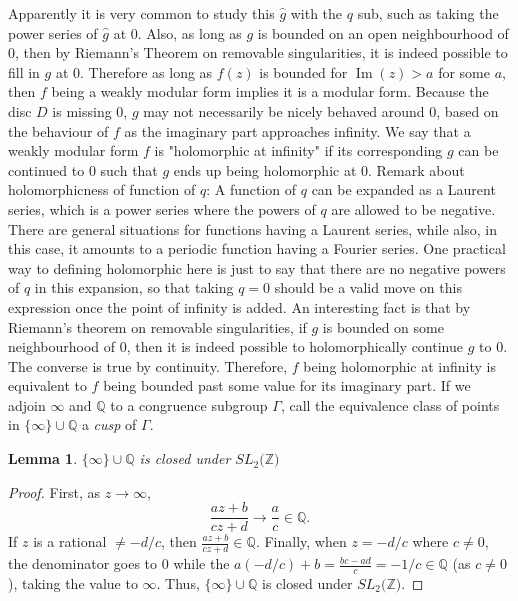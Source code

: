 \documentclass{article}
\newtheorem{lemma}[theorem]{Lemma}
\theoremstyle{definition}
\theoremstyle{definition}
\theoremstyle{definition}
\newcommand{\Q}{\mathbb{Q}}
\begin{document}
Apparently it is very common to study this $\hat{g}$ with the $q$ sub, such as taking the power series of $\hat{g}$ at $0$. Also, as long as $g$ is bounded on an open neighbourhood of $0$, then by Riemann's Theorem on removable singularities, it is indeed possible to fill in $g$ at $0$. Therefore as long as $f(z)$ is bounded for $\operatorname{Im}(z)>a$ for some $a$, then $f$ being a weakly modular form implies it is a modular form.
\newline\newline
Because the disc $D$ is missing $0$, $g$ may not necessarily be nicely behaved around $0$, based on the behaviour of $f$ as the imaginary part approaches infinity. We say that a weakly modular form $f$ is "holomorphic at infinity" if its corresponding $g$ can be continued to $0$ such that $g$ ends up being holomorphic at $0$.
\newline\newline
Remark about holomorphicness of function of $q$: A function of $q$ can be expanded as a Laurent series, which is a power series where the powers of $q$ are allowed to be negative. There are general situations for functions having a Laurent series, while also, in this case, it amounts to a periodic function having a Fourier series. One practical way to defining holomorphic here is just to say that there are no negative powers of $q$ in this expansion, so that taking $q=0$ should be a valid move on this expression once the point of infinity is added.
\newline\newline
An interesting fact is that by Riemann's theorem on removable singularities, if $g$ is bounded on some neighbourhood of $0$, then it is indeed possible to holomorphically continue $g$ to $0$. The converse is true by continuity. Therefore, $f$ being holomorphic at infinity is equivalent to $f$ being bounded past some value for its imaginary part.
\newline\newline
If we adjoin $\infty$ and $\mathbb{Q}$ to a congruence subgroup $\Gamma$, call the equivalence class of points in $\{\infty\}\cup \mathbb{Q}$ a \emph{cusp} of $\Gamma$. 

\begin{lemma}
    $\{\infty\}\cup \mathbb{Q}$ is closed under $SL_2(\mathbb{Z)}$
\end{lemma}
    

\begin{proof}
   First, as $z \to \infty$, $$\frac{az + b}{cz + d} \to \frac{a}{c}\in\Q.$$ 
   If $z$ is a rational $\neq -d/c$, then $\frac{az + b}{cz + d}\in\Q$. Finally, when $z = -d/c$ where $c\neq0$, the denominator goes to $0$ while the $a(-d/c) +b= \frac{bc-ad}{c}=-1/c \in \mathbb{Q}$ (as $c\neq0$), taking the value to $\infty$. Thus,  $\{\infty\}\cup \mathbb{Q}$ is closed under $SL_2(\mathbb{Z)}$. 
\end{proof}
\end{document}
